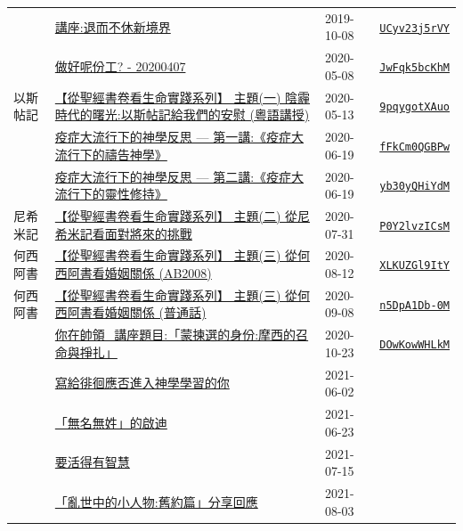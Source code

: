 \documentclass{book}
\begin{document}
{ \scriptsize


\begin{xltabular}{\textwidth}{|p{0.15\textwidth} p{0.6\textwidth}|p{0.07\textwidth} p{0.1\textwidth}|}
\hline
    & \hyperref[sec:UCyv23j5rVY]{講座:退而不休新境界} & 2019-10-08 & \href{https://youtube.com/watch?v=UCyv23j5rVY}{\texttt{UCyv23j5rVY}} \\
    & \hyperref[sec:JwFqk5bcKhM]{做好呢份工? - 20200407} & 2020-05-08 & \href{https://youtube.com/watch?v=JwFqk5bcKhM}{\texttt{JwFqk5bcKhM}} \\
以斯帖記   & \hyperref[sec:9pqygotXAuo]{【從聖經書卷看生命實踐系列】 主題(一) 陰霾時代的曙光:以斯帖記給我們的安慰 (粵語講授)} & 2020-05-13 & \href{https://youtube.com/watch?v=9pqygotXAuo}{\texttt{9pqygotXAuo}} \\
    & \hyperref[sec:fFkCm0QGBPw]{疫症大流行下的神學反思 --- 第一講:《疫症大流行下的禱告神學》} & 2020-06-19 & \href{https://youtube.com/watch?v=fFkCm0QGBPw}{\texttt{fFkCm0QGBPw}} \\
    & \hyperref[sec:yb30yQHiYdM]{疫症大流行下的神學反思 --- 第二講:《疫症大流行下的靈性修持》} & 2020-06-19 & \href{https://youtube.com/watch?v=yb30yQHiYdM}{\texttt{yb30yQHiYdM}} \\
尼希米記   & \hyperref[sec:P0Y2lvzICsM]{【從聖經書卷看生命實踐系列】 主題(二) 從尼希米記看面對將來的挑戰} & 2020-07-31 & \href{https://youtube.com/watch?v=P0Y2lvzICsM}{\texttt{P0Y2lvzICsM}} \\
何西阿書   & \hyperref[sec:XLKUZGl9ItY]{【從聖經書卷看生命實踐系列】 主題(三) 從何西阿書看婚姻關係 (AB2008)} & 2020-08-12 & \href{https://youtube.com/watch?v=XLKUZGl9ItY}{\texttt{XLKUZGl9ItY}} \\
何西阿書   & \hyperref[sec:n5DpA1Db_0M]{【從聖經書卷看生命實踐系列】 主題(三) 從何西阿書看婚姻關係 (普通話)} & 2020-09-08 & \href{https://youtube.com/watch?v=n5DpA1Db-0M}{\texttt{n5DpA1Db-0M}} \\
    & \hyperref[sec:DOwKowWHLkM]{你在帥領\_講座題目:「蒙揀選的身份:摩西的召命與掙扎」} & 2020-10-23 & \href{https://youtube.com/watch?v=DOwKowWHLkM}{\texttt{DOwKowWHLkM}} \\
    & \hyperref[sec:0]{寫給徘徊應否進入神學學習的你} & 2021-06-02 &  \\
    & \hyperref[sec:1]{「無名無姓」的啟迪} & 2021-06-23 &  \\
    & \hyperref[sec:2]{要活得有智慧} & 2021-07-15 &  \\
    & \hyperref[sec:3]{「亂世中的小人物:舊約篇」分享回應} & 2021-08-03 &  \\

\end{xltabular}}
\end{document}
